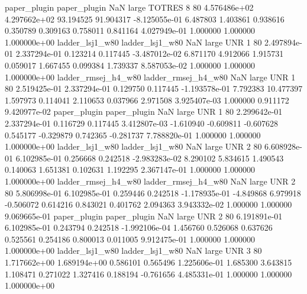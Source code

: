        paper_plugin        paper_plugin                   NaN      large   TOTRES                 8 80 4.576486e+02   4.297662e+02     93.194525      91.904317 -8.125055e-01      6.487803      1.403861     0.938616       0.350789  0.309163   0.758011     0.841164   4.027949e-01            1.000000        1.000000        1.000000e+00
    ladder_lsj1_w80     ladder_lsj1_w80                   NaN      large      UNR                 1 80 2.497894e-01   2.337294e-01      0.123214       0.117445 -3.487012e-02      6.871170      4.912066     1.915731       0.059017  1.667455   0.099384     1.739337   8.587053e-02            1.000000        1.000000        1.000000e+00
ladder_rmsej_h4_w80 ladder_rmsej_h4_w80                   NaN      large      UNR                 1 80 2.519425e-01   2.337294e-01      0.129750       0.117445 -1.193578e-01      7.792383     10.477397     1.597973       0.114041  2.110653   0.037966     2.971508   3.925407e-03            1.000000        0.911172        9.420977e-02
       paper_plugin        paper_plugin                   NaN      large      UNR                 1 80 2.299642e-01   2.337294e-01      0.116729       0.117445  3.412807e-03     -1.610940     -0.609811    -0.607628       0.545177 -0.329879   0.742365    -0.281737   7.788820e-01            1.000000        1.000000        1.000000e+00
    ladder_lsj1_w80     ladder_lsj1_w80                   NaN      large      UNR                 2 80 6.608928e-01   6.102985e-01      0.256668       0.242518 -2.983283e-02      8.290102      5.834615     1.490543       0.140063  1.651381   0.102631     1.192295   2.367147e-01            1.000000        1.000000        1.000000e+00
ladder_rmsej_h4_w80 ladder_rmsej_h4_w80                   NaN      large      UNR                 2 80 5.806998e-01   6.102985e-01      0.259446       0.242518 -1.178935e-01     -4.849868      6.979918    -0.506072       0.614216  0.843021   0.401762     2.094363   3.943332e-02            1.000000        1.000000        9.069665e-01
       paper_plugin        paper_plugin                   NaN      large      UNR                 2 80 6.191891e-01   6.102985e-01      0.243794       0.242518 -1.992106e-04      1.456760      0.526068     0.637626       0.525561  0.254186   0.800013     0.011005   9.912475e-01            1.000000        1.000000        1.000000e+00
    ladder_lsj1_w80     ladder_lsj1_w80                   NaN      large      UNR                 3 80 1.717662e+00   1.689194e+00      0.586101       0.565496  1.225606e-01      1.685300      3.643815     1.108471       0.271022  1.327416   0.188194    -0.761656   4.485331e-01            1.000000        1.000000        1.000000e+00
